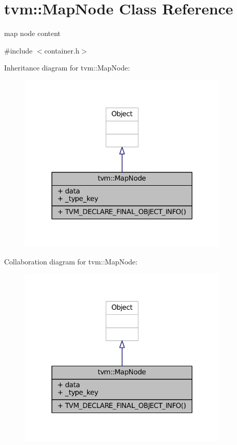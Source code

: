 \hypertarget{classtvm_1_1MapNode}{}\section{tvm\+:\+:Map\+Node Class Reference}
\label{classtvm_1_1MapNode}


map node content  




{\ttfamily \#include $<$container.\+h$>$}



Inheritance diagram for tvm\+:\+:Map\+Node\+:
\nopagebreak
\begin{figure}[H]
\begin{center}
\leavevmode
\includegraphics[width=285pt]{classtvm_1_1MapNode__inherit__graph}
\end{center}
\end{figure}


Collaboration diagram for tvm\+:\+:Map\+Node\+:
\nopagebreak
\begin{figure}[H]
\begin{center}
\leavevmode
\includegraphics[width=285pt]{classtvm_1_1MapNode__coll__graph}
\end{center}
\end{figure}

